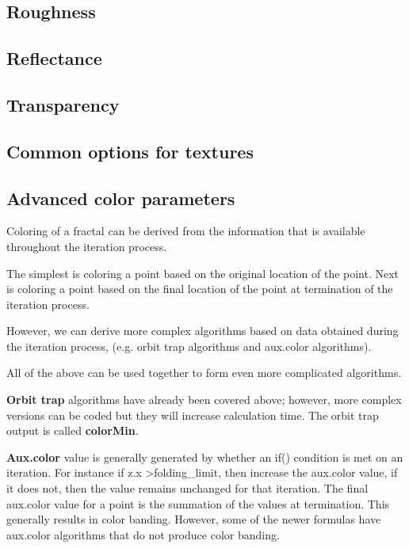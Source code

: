 \subsection{Roughness}\label{materials-roughness}

\subsection{Reflectance}\label{materials-reflectance}

\subsection{Transparency}\label{materials-transparency}

\subsection{Common options for textures}\label{materials-textures}

\subsection{Advanced color parameters}\label{materials-advanced-color-parameters}

Coloring of a fractal can be derived from the information that is available throughout the iteration process.

The simplest is coloring a point based on the original location of the point.
Next is coloring a point based on the final location of the point at termination of the iteration process.

However, we can derive more complex algorithms based on data obtained during the iteration process, (e.g. orbit trap algorithms and aux.color algorithms).

All of the above can be used together to form even more complicated algorithms.

\textbf{Orbit trap} algorithms have already been covered above; however, more complex versions can be coded but they will increase calculation time. The orbit trap output is called \textbf{colorMin}.

\textbf{Aux.color} value is generally generated by whether an if() condition is met on an iteration. For instance if z.x \textgreater\space folding\_limit, then increase the aux.color value, if it does not, then the value remains unchanged for that iteration. The final aux.color value for a point is the summation of the values at termination. This generally results in color banding. However, some of the newer formulas have aux.color algorithms that do not produce color banding.

